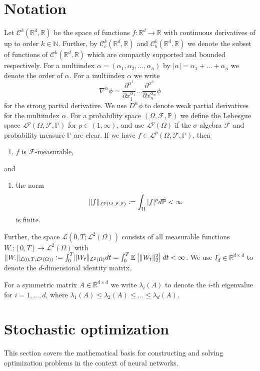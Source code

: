 \documentclass[12pt]{article}
\theoremstyle{definition}
\numberwithin{equation}{section}
\newcommand{\N}{\mathbb{N}}
\newcommand{\R}{\mathbb{R}}
\newcommand{\BP}{\mathbb{P}}
\newcommand{\CF}{\mathcal{F}}
\newcommand{\CL}{\mathcal{L}}
\newcommand{\CC}{\mathcal{C}}
\newcommand{\ev}[1]{\mathbb{E}\left[{#1}\right]}
\newcommand{\norm}[1]{\lVert{#1}\rVert_2}
\newcommand{\defeq}{\vcentcolon=}
\begin{document}
\section{Notation}
Let $\CC^k(\R^d, \R)$ be the space of functions $f: \R^d \rightarrow \R$ with continuous derivatives of up to order $k \in \N$. Further, by $\CC_c^k(\R^d, \R)$ and $\CC_b^k(\R^d, \R)$ we denote the subset of functions of $\CC^k(\R^d, \R)$ which are compactly supported and bounded respectively.
For a multiindex $\alpha = (\alpha_1, \alpha_2, \dots, \alpha_n)$ by $|\alpha| = \alpha_1 + \dots + \alpha_n$ we denote the order of $\alpha$.
For a multiindex $\alpha$ we write 
\begin{equation*}
  \nabla^{\alpha} \phi = \frac{\partial^{\alpha^1}}{\partial x_1^{\alpha_1}}\dots\frac{\partial^{\alpha^n}}{\partial x_n^{\alpha_n}} \phi
\end{equation*}
for the strong partial derivative. We use $D^{\alpha}\phi$ to denote weak partial derivatives for the multiindex $\alpha$.
For a probability space $(\Omega, \CF, \BP)$ we define the Lebesgue space $\CL^p(\Omega, \CF, \BP)$ for $p \in (1,\infty)$, and use $\CL^p(\Omega)$ if the $\sigma$-algebra $\CF$ and probability measure $\BP$ are clear. If we have $f \in\CL^p(\Omega, \CF, \BP)$, then
\begin{enumerate}[label=(\roman*)]
  \item $f$ is $\CF$-measurable,
\end{enumerate}
and
\begin{enumerate}[resume, label=(\roman*)]
  \item the norm 
  \begin{equation*}
    \lVert f \rVert_{\CL^p(\Omega, \CF, \BP)} \defeq \int_{\Omega} |f|^p d\BP < \infty
  \end{equation*}
  is finite.
\end{enumerate}
Further, the space $\CL(0,T;\CL^2(\Omega))$ consists of all measurable functions $W_{\cdot} : [0,T] \rightarrow \CL^2(\Omega)$ with $\lVert W_{\cdot} \rVert_{\CL(0,T;\CL^2(\Omega))} \defeq \int_0^T \lVert W_t \rVert_{\CL^2(\Omega)}dt = \int_0^T \ev{\norm{W_t}^2}dt < \infty$. We use $I_d \in \R^{d \times d}$ to denote the $d$-dimensional identity matrix.

For a symmetric matrix $A \in \R^{d \times d}$ we write $\lambda_i(A)$ to denote the $i$-th eigenvalue for $i=1,\dots,d$, where $\lambda_1(A) \leq \lambda_2(A) \leq \dots \leq \lambda_d(A)$.
\section{Stochastic optimization}
\label{sec:Optimization}
 This section covers the mathematical basis for constructing and solving optimization problems in the context of neural networks.
\end{document}
